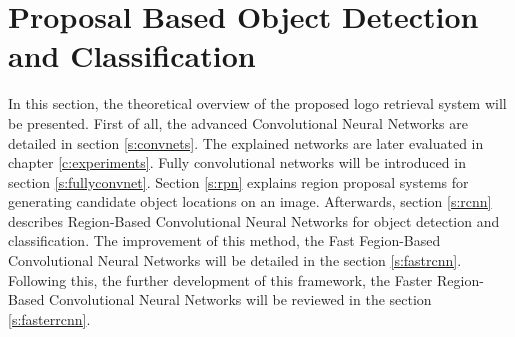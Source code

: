 \chapter{Proposal Based Object Detection and Classification}\label{c:theory}

In this section, the theoretical overview of the proposed logo retrieval system will be presented. First of all, the advanced Convolutional Neural Networks are detailed in section \ref{s:convnets}. The explained networks are later evaluated in chapter \ref{c:experiments}. Fully convolutional networks will be introduced in section \ref{s:fullyconvnet}. Section \ref{s:rpn} explains region proposal systems for generating candidate object locations on an image. Afterwards, section \ref{s:rcnn} describes Region-Based Convolutional Neural Networks for object detection and classification. The improvement of this method, the Fast Fegion-Based Convolutional Neural Networks will be detailed in the section \ref{s:fastrcnn}. Following this, the further development of this framework, the Faster Region-Based Convolutional Neural Networks will be reviewed in the section \ref{s:fasterrcnn}.
\bigbreak
